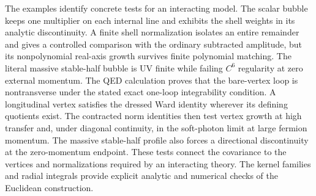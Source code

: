 \documentclass[final,5p,times,twocolumn,numbers,nopreprintline]{elsarticle}
\numberwithin{equation}{section}
\theoremstyle{definition}
\theoremstyle{remark}
\begin{document}
The examples identify concrete tests for an interacting model.
The scalar bubble keeps one multiplier on each internal line and
exhibits the shell weights in its analytic discontinuity. A finite
shell normalization isolates an entire remainder and gives a
controlled comparison with the ordinary subtracted amplitude, but
its nonpolynomial real-axis growth survives finite polynomial matching.
The literal massive stable-half bubble is UV finite while failing
\(C^6\) regularity at zero external momentum. The QED calculation
proves that the bare-vertex loop is nontransverse
under the stated exact one-loop integrability condition. A longitudinal
vertex satisfies the dressed Ward identity wherever its defining
quotients exist. The contracted norm identities then test vertex
growth at high transfer and, under diagonal continuity, in the
soft-photon limit at large fermion momentum. The massive stable-half
profile also forces a directional discontinuity at the zero-momentum
endpoint. These tests connect the covariance to the vertices and
normalizations required by an interacting theory. The kernel families
and radial integrals provide
explicit analytic and numerical checks of the Euclidean construction.
\end{document}

